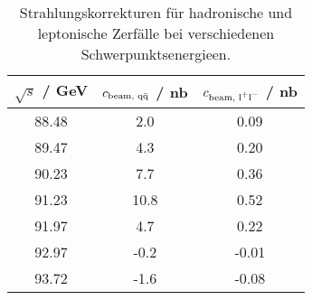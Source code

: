 \begin{table}[H]
\caption{Strahlungskorrekturen für hadronische und leptonische Zerfälle bei verschiedenen Schwerpunktsenergieen.}
\begin{center}
\begin{tabular}{|c|c|c|}
  \hline
  $\sqrt{s}$ / GeV & $c_\text{beam, q$\bar{\text{q}}$}$ / nb & $c_\text{beam, l$^+$l$^-$}$ / nb \\ \hline
  88.48 & 2.0 & 0.09 \\ \hline
  89.47 & 4.3 & 0.20 \\ \hline
  90.23 & 7.7 & 0.36 \\ \hline
  91.23 & 10.8 & 0.52 \\ \hline
  91.97 & 4.7 & 0.22 \\ \hline
  92.97 & -0.2 & -0.01 \\ \hline
  93.72 & -1.6 & -0.08 \\ \hline
\end{tabular}
\end{center}
\label{tab:beamcorrs}
\end{table}
